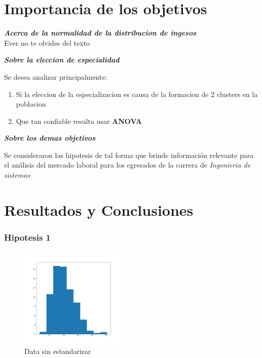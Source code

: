 \documentclass{beamer}
\begin{document}


\section{Importancia de los objetivos}

\begin{frame}
  \textbf{\textit{
    Acerca de la normalidad de la distribucion de ingesos
  }}
  \\
  \alert{Ever no te olvides del texto}
  \newline

  \textit{\textbf{
    Sobre la eleccion de especialidad
  }}


  Se desea analizar principalmente:

  \begin{enumerate}
      \item Si la eleccion de la especializacion es causa de la
        formacion de 2 clusters en la poblacion

      \item Que tan confiable resulta usar \textbf{ANOVA} \footnotemark
  \end{enumerate}


\end{frame}

\begin{frame}
  \textit{\textbf{
    Sobre los demas objetivos
  }}
  \newline

  Se consideraron las hipotesis de tal forma que brinde
  información relevante para el análisis del mercado laboral
  para los egresados de la carrera de \textit{Ingenieria de
  sistemas}

\end{frame}



\section{Resultados y Conclusiones}

\begin{frame}
  \frametitle{Hipotesis 1}
  \begin{figure}[t]
    \caption{Data sin estandarizar}
    \includegraphics[width=5cm]{Figure_1.png}
  \end{figure}

\end{frame}
\end{document}
